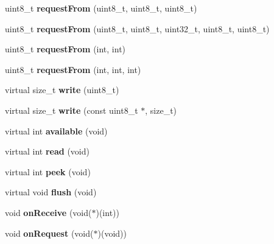 \begin{DoxyCompactItemize}
uint8\+\_\+t {\bfseries request\+From} (uint8\+\_\+t, uint8\+\_\+t, uint8\+\_\+t)
\item 
\mbox{\label{class_two_wire_acd59cc9570fd49b1cf9044cbefef85ac}} 
uint8\+\_\+t {\bfseries request\+From} (uint8\+\_\+t, uint8\+\_\+t, uint32\+\_\+t, uint8\+\_\+t, uint8\+\_\+t)
\item 
\mbox{\label{class_two_wire_ad40a27213d0bb32f7b819aa8962fccd3}} 
uint8\+\_\+t {\bfseries request\+From} (int, int)
\item 
\mbox{\label{class_two_wire_a3d76da36fb8571e0b5e8310e9f86f6fe}} 
uint8\+\_\+t {\bfseries request\+From} (int, int, int)
\item 
\mbox{\label{class_two_wire_a318b7bec156c1f1075a818c0ad3427d7}} 
virtual size\+\_\+t {\bfseries write} (uint8\+\_\+t)
\item 
\mbox{\label{class_two_wire_a1957b4d5a6a997bdde436e9e40d131a7}} 
virtual size\+\_\+t {\bfseries write} (const uint8\+\_\+t $\ast$, size\+\_\+t)
\item 
\mbox{\label{class_two_wire_aee57bc52bee06508e231c5fc6bc35ada}} 
virtual int {\bfseries available} (void)
\item 
\mbox{\label{class_two_wire_aa361b83500d00dfb93bb25b6473b33e9}} 
virtual int {\bfseries read} (void)
\item 
\mbox{\label{class_two_wire_a5bd64cb7bd609e9470a15d96a0991ec8}} 
virtual int {\bfseries peek} (void)
\item 
\mbox{\label{class_two_wire_a4d92ddf6ca349c815de1de15fca06b5e}} 
virtual void {\bfseries flush} (void)
\item 
\mbox{\label{class_two_wire_a860d97eb825c6fdca388f2f0577cc34a}} 
void {\bfseries on\+Receive} (void($\ast$)(int))
\item 
\mbox{\label{class_two_wire_a224bf8799dda398fc0db223801852ca5}} 
void {\bfseries on\+Request} (void($\ast$)(void))
\item 

\end{DoxyCompactItemize}

